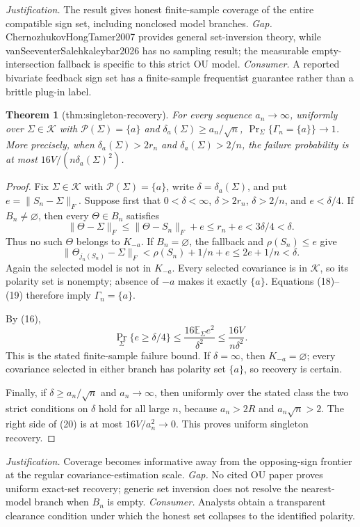 \documentclass{article}
\newtheorem{theorem}{Theorem}
\begin{document}
\par\smallskip\noindent \textit{Justification.} The result gives honest finite-sample coverage of the entire compatible sign set, including nonclosed model branches. \textit{Gap.} ChernozhukovHongTamer2007 provides general set-inversion theory, while vanSeeventerSalehkaleybar2026 has no sampling result; the measurable empty-intersection fallback is specific to this strict OU model. \textit{Consumer.} A reported bivariate feedback sign set has a finite-sample frequentist guarantee rather than a brittle plug-in label.

\begin{theorem}[thm:singleton-recovery]\label{thm:singleton-recovery}
For every sequence \(a_n\to\infty\), uniformly over \(\Sigma\in\mathcal K\) with \(\mathcal P(\Sigma)=\{a\}\) and \(\delta_a(\Sigma)\ge a_n/\sqrt n\), \(\Pr_{\Sigma}\{\Gamma_n=\{a\}\}\to1\). More precisely, when \(\delta_a(\Sigma)>2r_n\) and \(\delta_a(\Sigma)>2/n\), the failure probability is at most \(16V/(n\delta_a(\Sigma)^2)\).
\end{theorem}
\begin{proof}
Fix \(\Sigma\in\mathcal K\) with \(\mathcal P(\Sigma)=\{a\}\), write \(\delta=\delta_a(\Sigma)\), and put \(e=\lVert S_n-\Sigma\rVert_F\).  Suppose first that \(0<\delta<\infty\), \(\delta>2r_n\), \(\delta>2/n\), and \(e<\delta/4\).  If \(B_n\ne\varnothing\), then every \(\Theta\in B_n\) satisfies
\[
 \lVert\Theta-\Sigma\rVert_F
 \le\lVert\Theta-S_n\rVert_F+e
 \le r_n+e<3\delta/4<\delta. \tag{18}
\]
Thus no such \(\Theta\) belongs to \(K_{-a}\).  If \(B_n=\varnothing\), the fallback and \(\rho(S_n)\le e\) give
\[
 \lVert\Theta_{j_n(S_n)}-\Sigma\rVert_F
 <\rho(S_n)+1/n+e\le2e+1/n<\delta. \tag{19}
\]
Again the selected model is not in \(K_{-a}\).  Every selected covariance is in \(\mathcal K\), so its polarity set is nonempty; absence of \(-a\) makes it exactly \(\{a\}\).  Equations (18)--(19) therefore imply \(\Gamma_n=\{a\}\).

By (16),
\[
 \Pr_{\Sigma}\{e\ge\delta/4\}
 \le\frac{16\mathbb E_{\Sigma}e^2}{\delta^2}
 \le\frac{16V}{n\delta^2}. \tag{20}
\]
This is the stated finite-sample failure bound.  If \(\delta=\infty\), then \(K_{-a}=\varnothing\); every covariance selected in either branch has polarity set \(\{a\}\), so recovery is certain.

Finally, if \(\delta\ge a_n/\sqrt n\) and \(a_n\to\infty\), then uniformly over the stated class the two strict conditions on \(\delta\) hold for all large \(n\), because \(a_n>2R\) and \(a_n\sqrt n>2\).  The right side of (20) is at most \(16V/a_n^2\to0\).  This proves uniform singleton recovery.
\end{proof}
\par\smallskip\noindent \textit{Justification.} Coverage becomes informative away from the opposing-sign frontier at the regular covariance-estimation scale. \textit{Gap.} No cited OU paper proves uniform exact-set recovery; generic set inversion does not resolve the nearest-model branch when \(B_n\) is empty. \textit{Consumer.} Analysts obtain a transparent clearance condition under which the honest set collapses to the identified polarity.
\end{document}
